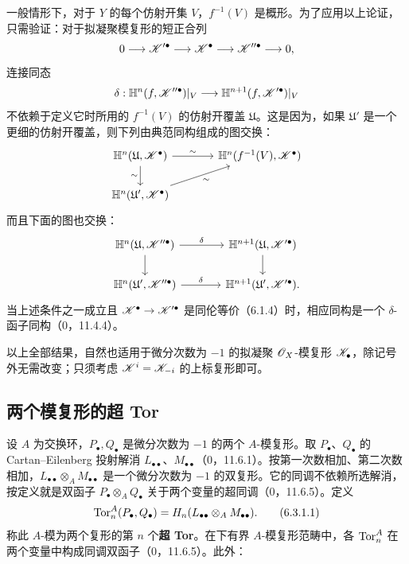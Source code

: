 一般情形下，对于 $Y$ 的每个仿射开集 $V$，$f^{-1}(V)$ 是概形。为了应用以上论证，只需验证：对于拟凝聚模复形的短正合列
\[
 0\longrightarrow\mathscr K'^\bullet\longrightarrow\mathscr K^\bullet
 \longrightarrow\mathscr K''^\bullet\longrightarrow0,
\]
连接同态
\[
 \delta:\mathbb H^n(f,\mathscr K''^\bullet)|_V
 \longrightarrow\mathbb H^{n+1}(f,\mathscr K'^\bullet)|_V
\]
不依赖于定义它时所用的 $f^{-1}(V)$ 的仿射开覆盖 $\mathfrak U$。这是因为，如果 $\mathfrak U'$ 是一个更细的仿射开覆盖，则下列由典范同构组成的图交换：
\[
\begin{tikzcd}[column sep=large]
\mathbb H^n(\mathfrak U,\K^\bullet) \arrow[r,"\sim"] \arrow[d,"\sim"'] & \mathbb H^n(f^{-1}(V),\K^\bullet)\\
\mathbb H^n(\mathfrak U',\K^\bullet) \arrow[ur,"\sim"'] &
\end{tikzcd}
\]
而且下面的图也交换：
\[
\begin{tikzcd}[column sep=large]
\mathbb H^n(\mathfrak U,\K''^\bullet) \arrow[r,"\delta"] \arrow[d] & \mathbb H^{n+1}(\mathfrak U,\K'^\bullet) \arrow[d]\\
\mathbb H^n(\mathfrak U',\K''^\bullet) \arrow[r,"\delta"] & \mathbb H^{n+1}(\mathfrak U',\K'^\bullet).
\end{tikzcd}
\]
当上述条件之一成立且 $\mathscr K^\bullet\to\mathscr K'^\bullet$ 是同伦等价（6.1.4）时，相应同构是一个 $\delta$-函子同构（0，11.4.4）。

以上全部结果，自然也适用于微分次数为 $-1$ 的拟凝聚 $\mathscr O_X$-模复形 $\mathscr K_\bullet$，除记号外无需改变；只须考虑 $\mathscr K^i=\mathscr K_{-i}$ 的上标复形即可。

\subsection{两个模复形的超 Tor}
设 $A$ 为交换环，$P_\bullet,Q_\bullet$ 是微分次数为 $-1$ 的两个 $A$-模复形。取 $P_\bullet$、$Q_\bullet$ 的 Cartan--Eilenberg 投射解消 $L_{\bullet\bullet}$、$M_{\bullet\bullet}$（0，11.6.1）。按第一次数相加、第二次数相加，$L_{\bullet\bullet}\otimes_A M_{\bullet\bullet}$ 是一个微分次数为 $-1$ 的双复形。它的同调不依赖所选解消，按定义就是双函子 $P_\bullet\otimes_AQ_\bullet$ 关于两个变量的超同调（0，11.6.5）。定义
\begin{equation}
 \operatorname{Tor}_n^A(P_\bullet,Q_\bullet)
 =H_n(L_{\bullet\bullet}\otimes_A M_{\bullet\bullet}).\tag{6.3.1.1}
\end{equation}
称此 $A$-模为两个复形的第 $n$ 个\textbf{超 Tor}。在下有界 $A$-模复形范畴中，各 $\operatorname{Tor}_n^A$ 在两个变量中构成同调双函子（0，11.6.5）。此外：


